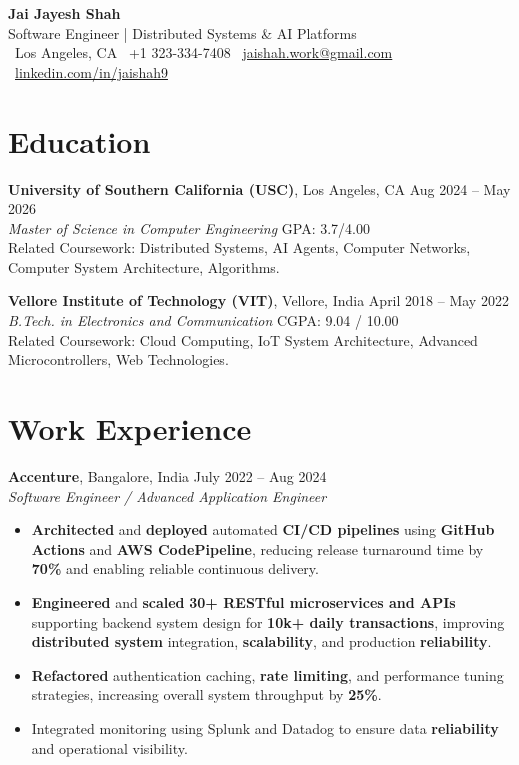 \documentclass[letterpaper,11pt]{article}
\begin{document}
\begin{center}
    {\LARGE \textbf{Jai Jayesh Shah}}\\
    {\normalsize Software Engineer | Distributed Systems \& AI Platforms}\\
    \small
    \faMapMarker*\ Los Angeles, CA
    \quad
    \faPhone*\ +1 323-334-7408
    \quad
    \faEnvelope\ \href{mailto:jaishah.work@gmail.com}{jaishah.work@gmail.com}
    \quad
    \faLinkedin\ \href{https://www.linkedin.com/in/jaishah9}{linkedin.com/in/jaishah9}
\end{center}
\vspace{-13pt}

\section*{Education}
\textbf{University of Southern California (USC)}, Los Angeles, CA \hfill Aug 2024 -- May 2026 \\
\textit{Master of Science in Computer Engineering} \hfill GPA: 3.7/4.00 \\
Related Coursework: Distributed Systems, AI Agents, Computer Networks, Computer System Architecture, Algorithms.

\textbf{Vellore Institute of Technology (VIT)}, Vellore, India \hfill April 2018 -- May 2022 \\
\textit{B.Tech. in Electronics and Communication} \hfill CGPA: 9.04 / 10.00 \\
Related Coursework: Cloud Computing, IoT System Architecture, Advanced Microcontrollers, Web Technologies.

\section*{Work Experience}
\textbf{Accenture}, Bangalore, India \hfill July 2022 -- Aug 2024 \\
\textit{Software Engineer / Advanced Application Engineer}
\begin{itemize}
    \item \textbf{Architected} and \textbf{deployed} automated \textbf{CI/CD pipelines} using \textbf{GitHub Actions} and \textbf{AWS CodePipeline}, reducing release turnaround time by \textbf{70\%} and enabling reliable continuous delivery.
    \item \textbf{Engineered} and \textbf{scaled} \textbf{30+ RESTful microservices and APIs} supporting backend system design for \textbf{10k+ daily transactions}, improving \textbf{distributed system} integration, \textbf{scalability}, and production \textbf{reliability}.
    \item \textbf{Refactored} authentication caching, \textbf{rate limiting}, and performance tuning strategies, increasing overall system throughput by \textbf{25\%}.
    \item Integrated monitoring using Splunk and Datadog to ensure data \textbf{reliability} and operational visibility.
\end{itemize}
\end{document}

